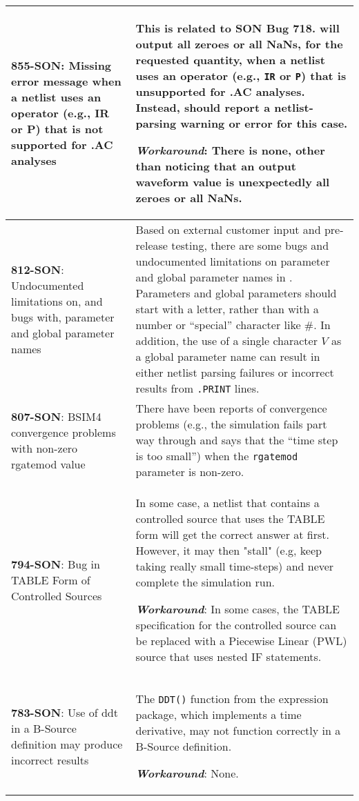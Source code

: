 {\begin{longtable}[h] {>{\raggedright\small}m{2in}|>{\raggedright\let\\\tabularnewline\small}m{3.5in}}
\textbf{855-SON}: Missing error message when a netlist uses an operator (e.g.,
IR or P) that is not supported for .AC analyses & This is related to
SON Bug 718.  \Xyce{} will output all zeroes or all NaNs, for the
requested quantity, when a netlist uses an operator (e.g.,
\texttt{IR} or \texttt{P}) that is unsupported for .AC analyses.  Instead,
\Xyce{} should report a netlist-parsing warning or error for this case.

\textbf{\textit{Workaround}}: There is none, other than noticing that an
output waveform value is unexpectedly all zeroes or all
NaNs. \\ \hline

\textbf{812-SON}: Undocumented limitations on, and bugs with, parameter and
global parameter names & Based on external customer input and
pre-release testing, there are some bugs and undocumented limitations
on parameter and global parameter names in
\Xyce{}. Parameters and global parameters should start with a letter, rather
than with a number or ``special'' character like \#.  In addition, the
use of a single character $V$ as a global parameter name can result in
either netlist parsing failures or incorrect results
from \texttt{.PRINT} lines.  \\ \hline

\textbf{807-SON}: BSIM4 convergence problems with non-zero rgatemod value &
There have been reports of convergence problems (e.g., the \Xyce{}
simulation fails part way through and says that the ``time step is too
small'') when the \texttt{rgatemod} parameter is non-zero. \\ \hline

\textbf{794-SON}: Bug in TABLE Form of \Xyce{} Controlled Sources & In some case, a \Xyce{}
netlist that contains a controlled source that uses the TABLE form will get
the correct answer at first.  However, it may then "stall" (e.g, keep
taking really small time-steps) and never complete the simulation run.

\textbf{\textit{Workaround}}: In some cases, the TABLE specification for the controlled
source can be replaced with a Piecewise Linear (PWL) source that uses
nested IF statements. \\ \hline

\textbf{783-SON}: Use of ddt in a B-Source definition may produce incorrect
results & The \texttt{DDT()} function from the \Xyce{} expression
package, which implements a time derivative, may not function
correctly in a B-Source definition.

\textbf{\textit{Workaround}}: None. \\ \hline


\end{longtable}}
